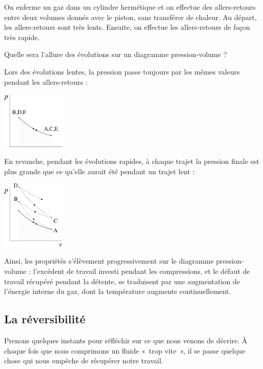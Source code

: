 			
			\begin{anexample}
				On enferme un gaz dans un cylindre hermétique et on effectue des allers-retours entre deux volumes donnés avec le piston, sans transférer de chaleur. Au départ, les allers-retours sont très lents. Ensuite, on effectue les allers-retours de façon très rapide.
				
				Quelle sera l’allure des évolutions sur un diagramme pression-volume ?
					\begin{answer}
						Lors des évolutions lentes, la pression passe toujours par les mêmes valeurs pendant les allers-retours :
							\begin{center}
								\includegraphics[width=3cm]{images/ex_pv_rev.png}
							\end{center}
						En revanche, pendant les évolutions rapides, à chaque trajet la pression finale est plus grande que ce qu’elle aurait été pendant un trajet lent :
							\begin{center}
								\includegraphics[width=3cm]{images/ex_pv_irr.png}
							\end{center}
						Ainsi, les propriétés s’élèvement progressivement sur le diagramme pression-volume : l’excédent de travail investi pendant les compressions, et le défaut de travail récupéré pendant la détente, se traduisent par une augmentation de l’énergie interne du gaz, dont la température augmente continuellement.
					\end{answer}
			\end{anexample}


	\subsection{La réversibilité}
	\label{ch_reversibilite}
	
		Prenons quelques instants pour réfléchir sur ce que nous venons de décrire. À chaque fois que nous comprimons un fluide «~trop vite~», il se passe quelque chose qui nous empêche de récupérer notre travail.
		
